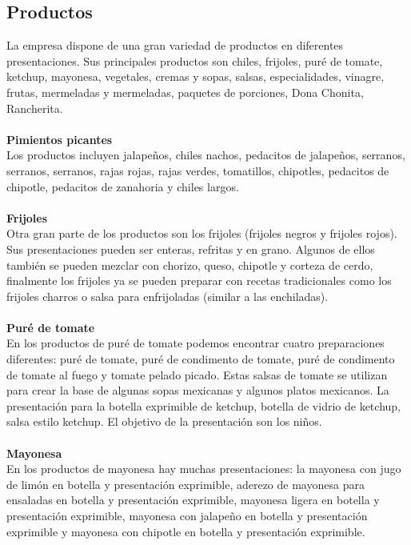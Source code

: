 \documentclass[12pt,letterpaper]{article}
\begin{document}
\subsection{Productos}
La empresa dispone de una gran variedad de productos en diferentes presentaciones. Sus principales productos son chiles, frijoles, puré de 
tomate, ketchup, mayonesa, vegetales, cremas y sopas, salsas, especialidades, vinagre, frutas, mermeladas y mermeladas, paquetes de porciones, 
Dona Chonita, Rancherita.
\\ \\
\textbf{Pimientos picantes} 
\\
Los productos incluyen jalapeños, chiles nachos, pedacitos de jalapeños, serranos, serranos, serranos, rajas rojas, rajas verdes, tomatillos, 
chipotles, pedacitos de chipotle, pedacitos de zanahoria y chiles largos.
\\ \\
\textbf{Frijoles} 
\\
Otra gran parte de los productos son los frijoles (frijoles negros y frijoles rojos). Sus presentaciones pueden ser enteras, refritas y en grano. 
Algunos de ellos también se pueden mezclar con chorizo, queso, chipotle y corteza de cerdo, finalmente los frijoles ya se pueden preparar con 
recetas tradicionales como los frijoles charros o salsa para enfrijoladas (similar a las enchiladas). 
\\ \\
\textbf{Puré de tomate} 
\\
En los productos de puré de tomate podemos encontrar cuatro preparaciones diferentes: puré de tomate, puré de condimento de tomate, puré de 
condimento de tomate al fuego y tomate pelado picado. Estas salsas de tomate se utilizan para crear la base de algunas sopas mexicanas y 
algunos platos mexicanos. La presentación para la botella exprimible de ketchup, botella de vidrio de ketchup, salsa estilo ketchup. El 
objetivo de la presentación son los niños.
\\ \\
\textbf{Mayonesa} 
\\
En los productos de mayonesa hay muchas presentaciones: la mayonesa con jugo de limón en botella y presentación exprimible, aderezo de 
mayonesa para ensaladas en botella y presentación exprimible, mayonesa ligera en botella y presentación exprimible, mayonesa con jalapeño 
en botella y presentación exprimible y mayonesa con chipotle en botella y presentación exprimible.
\\ \\
\end{document}
